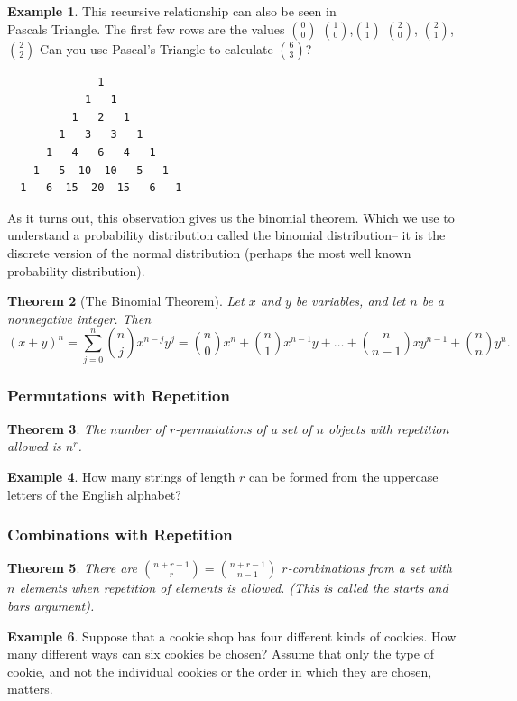 \documentclass[letterpaper,10pt]{article}
\theoremstyle{plain}
\newtheorem{thm}{Theorem}[section]
\theoremstyle{definition}
\newtheorem{exmp}[thm]{Example}
\theoremstyle{remark}
\begin{document}
\begin{exmp}
This recursive relationship can also be seen in\\
Pascals Triangle. The first few rows are the values
\newline
$\binom{0}{0}$
\newline
$\binom{1}{0}$,$\binom{1}{1}$
\newline
$\binom{2}{0}$, $\binom{2}{1}$,$\binom{2}{2}$
\newline
Can you use Pascal's Triangle to calculate $\binom{6}{3}$?

\begin{verbatim}
              1
            1   1
          1   2   1
        1   3   3   1
      1   4   6   4   1
    1   5  10  10   5   1
  1   6  15  20  15   6   1
\end{verbatim}
\end{exmp}
As it turns out, this observation gives us the binomial theorem. Which we use to understand a probability distribution called the binomial distribution-- it is the discrete version of the normal distribution (perhaps the most well known probability distribution).
\begin{thm}[The Binomial Theorem]
    Let \(x\) and \(y\) be variables, and let \(n\) be a nonnegative integer. Then
    \[
    (x + y)^n = \sum_{j=0}^{n} \binom{n}{j} x^{n-j}y^j = \binom{n}{0}x^n + \binom{n}{1}x^{n-1}y + \ldots + \binom{n}{n-1}xy^{n-1} + \binom{n}{n}y^n.
    \]
\end{thm}

\subsubsection{Permutations with Repetition}
\begin{thm}
    The number of $r$-permutations of a set of $n$ objects with repetition allowed is $n^r$.
\end{thm}
\begin{exmp}
    How many strings of length $r$ can be formed from the uppercase letters of the English alphabet?
\vspace{3cm}
\end{exmp}
\subsubsection{Combinations with Repetition}
\begin{thm}
    There are $\binom{n + r - 1}{r} = \binom{n + r - 1}{n - 1}$ $r$-combinations from a set with $n$ elements when repetition of elements is allowed. (This is called the starts and bars argument).
\end{thm}
\begin{exmp}
    Suppose that a cookie shop has four different kinds of cookies. How many different ways can six cookies be chosen? Assume that only the type of cookie, and not the individual cookies or the order in which they are chosen, matters.
\vspace{3cm}
\end{exmp}
\end{document}
